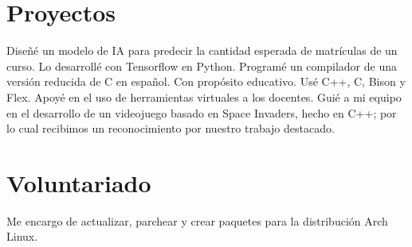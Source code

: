 \documentclass[10pt, a4paper]{moderncv}
\begin{document}
\section{Proyectos}
{
	Diseñé un modelo de IA para predecir la cantidad esperada de matrículas de un curso.
	Lo desarrollé con Tensorflow en Python.
}
{
	Programé un compilador de una versión reducida de C en español.
	Con propósito educativo.
	Usé C++, C, Bison y Flex.
}
{
	Apoyé en el uso de herramientas virtuales a los docentes.
}
{
	Guié a mi equipo en el desarrollo de un videojuego basado en Space Invaders,
	hecho en C++; por lo cual recibimos un reconocimiento por nuestro trabajo destacado.
}

\section{Voluntariado}
{
	Me encargo de actualizar, parchear y crear paquetes para la distribución
	Arch Linux.
}

\end{document}

